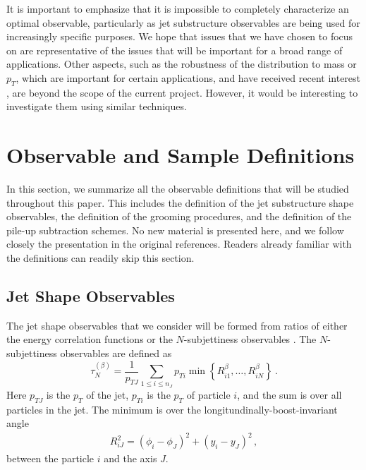 \documentclass[11pt,letterpaper]{article}
\newcommand{\Nsub}[2]{\tau_{#1}^{(#2)}}
\begin{document}
It is important to emphasize that it is impossible to completely
characterize an optimal observable, particularly as jet substructure
observables are being used for increasingly specific
purposes.
%
We hope that issues that we have chosen to focus on
are representative of the issues that will be important for a broad
range of applications.
%
Other aspects, such as the robustness of the distribution to mass or $p_T$, which are important for certain applications, and have received recent interest \cite{Shimmin:2017mfk,Aguilar-Saavedra:2017rzt,Moult:2017okx}, are
beyond the scope of the current project.
However, it would be interesting to investigate them
using similar techniques.


\section{Observable and Sample Definitions}\label{sec:obs_def}

In this section, we summarize all the observable definitions that will be studied throughout this paper.
%
This includes the definition of the jet substructure shape observables, the definition of the grooming procedures, and the definition of the pile-up subtraction schemes.
%
No new material is presented here, and we follow closely the presentation in the original references.
%
Readers already familiar with the definitions can readily skip this section.



\subsection{Jet Shape Observables}\label{sec:shape_def}

The jet shape observables that we consider will be formed from ratios of either the energy correlation functions \cite{Larkoski:2013eya,Moult:2016cvt} or the $N$-subjettiness observables \cite{Thaler:2010tr,Thaler:2011gf}.
%
The $N$-subjettiness observables are defined as \cite{Stewart:2010tn,Thaler:2010tr,Thaler:2011gf}
%
\begin{equation}\label{eq:nsubdef}
\Nsub{N}{\beta} = \frac{1}{p_{TJ}}\sum_{1\leq i \leq n_J} p_{Ti}\min\left\{
R_{i1}^\beta,\dotsc,R_{iN}^\beta
\right\} \ .
\end{equation}
%
Here $p_{TJ}$ is the $p_T$ of the jet, $p_{Ti}$ is the $p_T$ of particle $i$, and the sum is over all particles in the jet.
%
The minimum is over the longitundinally-boost-invariant angle
%
\begin{align}\label{eq:ptratio}  
R_{iJ}^2 = (\phi_i-\phi_J)^2+(y_i-y_J)^2\,,
\end{align}
%
between the particle $i$ and the axis $J$.
\end{document}
